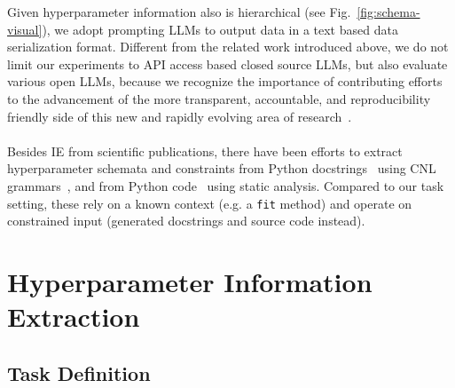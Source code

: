 Given hyperparameter information also is hierarchical (see Fig.~\ref{fig:schema-visual}), we adopt prompting LLMs to output data in a text based data serialization format. Different from the related work introduced above, we do not limit our experiments to API access based closed source LLMs, but also evaluate various open LLMs, because we recognize the importance of contributing efforts to the advancement of the more transparent, accountable, and reproducibility friendly side of this new and rapidly evolving area of research~\cite{Liesenfeld2023}.\\
\\
Besides IE from scientific publications, there have been efforts to extract hyperparameter schemata and constraints from Python docstrings~\cite{Baudart2020} using CNL grammars~\cite{Kuhn2014}, and from Python code~\cite{RakAmnouykit2021} using static analysis. Compared to our task setting, these rely on a known context (e.g. a \texttt{fit} method) and operate on constrained input (generated docstrings and source code instead).

\section{Hyperparameter Information Extraction}\label{sec:hyperpie}


\subsection{Task Definition}


